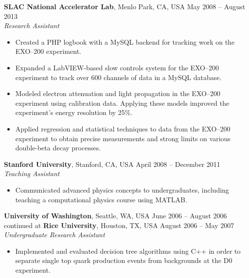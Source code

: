 \documentclass[margin,line]{resume}
\begin{document}
\begin{resume}
    \textbf{SLAC National Accelerator Lab}, Menlo Park, CA, USA \hfill May 2008 -- August 2013\vspace{1mm}\\\vspace{1mm}%
    \textsl{Research Assistant}
    \begin{itemize}
    \item Created a PHP logbook with a MySQL backend for tracking work on the EXO--200 experiment.
    \item Expanded a LabVIEW-based slow controls system for the EXO--200 experiment to track over 600 channels of data in a MySQL database.
    \item Modeled electron attenuation and light propagation in the EXO--200 experiment using calibration data. Applying these models improved the experiment's energy resolution by 25\%.
    \item Applied regression and statistical techniques to data from the EXO--200 experiment to obtain precise measurements and strong limits on various double-beta decay processes.
    \end{itemize}
    
    \textbf{Stanford University}, Stanford, CA, USA \hfill April 2008 -- December 2011 \vspace{0mm}\\
    \textsl{Teaching Assistant}
    \begin{itemize}
    \item Communicated advanced physics concepts to undergraduates, including teaching a computational physics course using MATLAB.
    \end{itemize}
    
    \textbf{University of Washington}, Seattle, WA, USA \hfill June 2006 -- August 2006 \vspace{0mm}\\
    continued at \textbf{Rice University}, Houston, TX, USA \hfill August 2006 -- May 2007 \vspace{1mm}\\\vspace{1mm}%
    \textsl{Undergraduate Research Assistant}
    \begin{itemize}
    \item Implemented and evaluated decision tree algorithms using C++ in order to separate single top quark production events from backgrounds at the D0 experiment.
    \end{itemize}
 

\end{resume}
\end{document}
